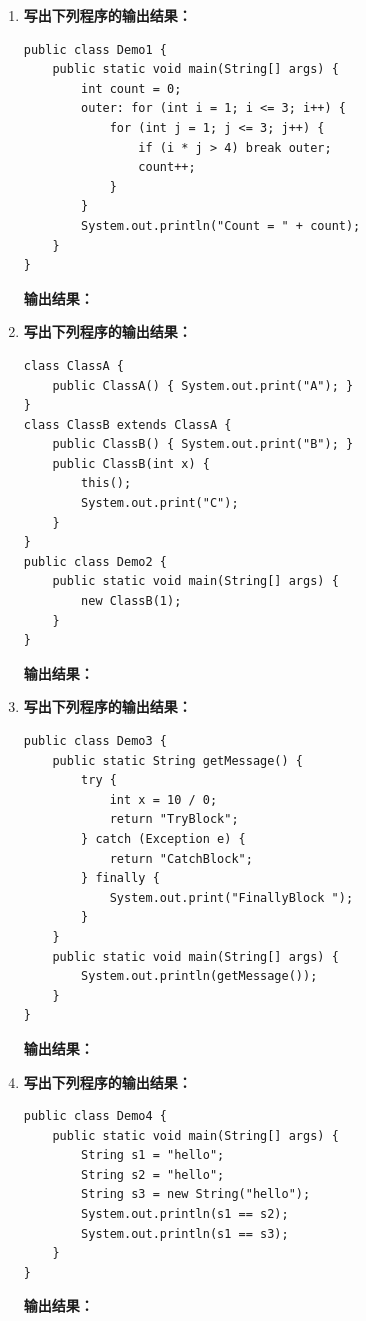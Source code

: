 \documentclass[a3paper, landscape, 11pt, twocolumn]{article}
\begin{document}
\begin{enumerate}[label=\arabic*., itemsep=1em]
	\item \textbf{写出下列程序的输出结果：}
	      \begin{lstlisting}[style=JavaExam]
public class Demo1 {
    public static void main(String[] args) {
        int count = 0;
        outer: for (int i = 1; i <= 3; i++) {
            for (int j = 1; j <= 3; j++) {
                if (i * j > 4) break outer;
                count++;
            }
        }
        System.out.println("Count = " + count);
    }
}
\end{lstlisting}
	      \textbf{输出结果：}\underline{\hspace{8cm}}

	\item \textbf{写出下列程序的输出结果：}
	      \begin{lstlisting}[style=JavaExam]
class ClassA {
    public ClassA() { System.out.print("A"); }
}
class ClassB extends ClassA {
    public ClassB() { System.out.print("B"); }
    public ClassB(int x) { 
        this(); 
        System.out.print("C"); 
    }
}
public class Demo2 {
    public static void main(String[] args) {
        new ClassB(1);
    }
}
\end{lstlisting}
	      \textbf{输出结果：}\underline{\hspace{8cm}}

	\item \textbf{写出下列程序的输出结果：}
	      \begin{lstlisting}[style=JavaExam]
public class Demo3 {
    public static String getMessage() {
        try {
            int x = 10 / 0;
            return "TryBlock";
        } catch (Exception e) {
            return "CatchBlock";
        } finally {
            System.out.print("FinallyBlock ");
        }
    }
    public static void main(String[] args) {
        System.out.println(getMessage());
    }
}
\end{lstlisting}
	      \textbf{输出结果：}\underline{\hspace{8cm}}

	\item \textbf{写出下列程序的输出结果：}
	      \begin{lstlisting}[style=JavaExam]
public class Demo4 {
    public static void main(String[] args) {
        String s1 = "hello";
        String s2 = "hello";
        String s3 = new String("hello");
        System.out.println(s1 == s2);
        System.out.println(s1 == s3);
    }
}
\end{lstlisting}
	      \textbf{输出结果：}\underline{\hspace{8cm}}


\end{enumerate}
\end{document}
